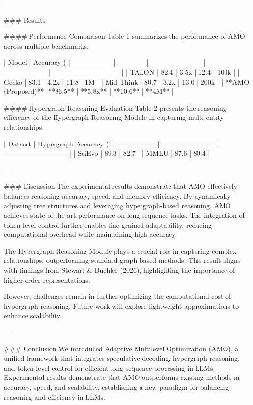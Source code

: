 ---

### Results  

#### Performance Comparison  
Table 1 summarizes the performance of AMO across multiple benchmarks.

| Model            | Accuracy (%
|-------------------|--------------|------------------------|--------------------|-------------------------------|
| TALON            | 82.4         | 3.5x                   | 12.4               | 100k                          |
| Gecko            | 83.1         | 4.2x                   | 11.8               | 1M                            |
| Mid-Think        | 80.7         | 3.2x                   | 13.0               | 200k                          |
| **AMO (Proposed)**| **86.5**    | **5.8x**              | **10.6**           | **4M**                        |

#### Hypergraph Reasoning Evaluation  
Table 2 presents the reasoning efficiency of the Hypergraph Reasoning Module in capturing multi-entity relationships.

| Dataset           | Hypergraph Accuracy (%
|--------------------|--------------------------|-----------------------------|
| SciEvo            | 89.3                     | 82.7                        |
| MMLU              | 87.6                     | 80.4                        |

---

### Discussion  
The experimental results demonstrate that AMO effectively balances reasoning accuracy, speed, and memory efficiency. By dynamically adjusting tree structures and leveraging hypergraph-based reasoning, AMO achieves state-of-the-art performance on long-sequence tasks. The integration of token-level control further enables fine-grained adaptability, reducing computational overhead while maintaining high accuracy.

The Hypergraph Reasoning Module plays a crucial role in capturing complex relationships, outperforming standard graph-based methods. This result aligns with findings from Stewart & Buehler (2026), highlighting the importance of higher-order representations.

However, challenges remain in further optimizing the computational cost of hypergraph reasoning. Future work will explore lightweight approximations to enhance scalability.

---

### Conclusion  
We introduced Adaptive Multilevel Optimization (AMO), a unified framework that integrates speculative decoding, hypergraph reasoning, and token-level control for efficient long-sequence processing in LLMs. Experimental results demonstrate that AMO outperforms existing methods in accuracy, speed, and scalability, establishing a new paradigm for balancing reasoning and efficiency in LLMs.

